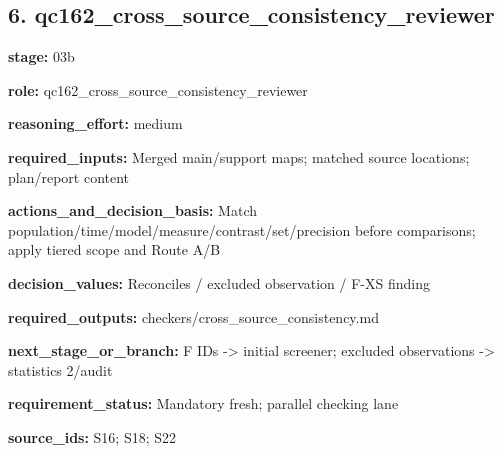 \documentclass[10pt,a4paper]{article}
\begin{document}
\subsection*{6.\allowbreak{} qc162\_\allowbreak{}cross\_\allowbreak{}source\_\allowbreak{}consistency\_\allowbreak{}reviewer}
\textbf{stage:} 03b\par
\textbf{role:} qc162\_\allowbreak{}cross\_\allowbreak{}source\_\allowbreak{}consistency\_\allowbreak{}reviewer\par
\textbf{reasoning\_\allowbreak{}effort:} medium\par
\textbf{required\_\allowbreak{}inputs:} Merged main/\allowbreak{}support maps; matched source locations; plan/\allowbreak{}report content\par
\textbf{actions\_\allowbreak{}and\_\allowbreak{}decision\_\allowbreak{}basis:} Match population/\allowbreak{}time/\allowbreak{}model/\allowbreak{}measure/\allowbreak{}contrast/\allowbreak{}set/\allowbreak{}precision before comparisons; apply tiered scope and Route A/\allowbreak{}B\par
\textbf{decision\_\allowbreak{}values:} Reconciles /\allowbreak{} excluded observation /\allowbreak{} F-\allowbreak{}XS finding\par
\textbf{required\_\allowbreak{}outputs:} checkers/\allowbreak{}cross\_\allowbreak{}source\_\allowbreak{}consistency.\allowbreak{}md\par
\textbf{next\_\allowbreak{}stage\_\allowbreak{}or\_\allowbreak{}branch:} F IDs -\allowbreak{}> initial screener; excluded observations -\allowbreak{}> statistics 2/\allowbreak{}audit\par
\textbf{requirement\_\allowbreak{}status:} Mandatory fresh; parallel checking lane\par
\textbf{source\_\allowbreak{}ids:} S16; S18; S22\par
\end{document}
